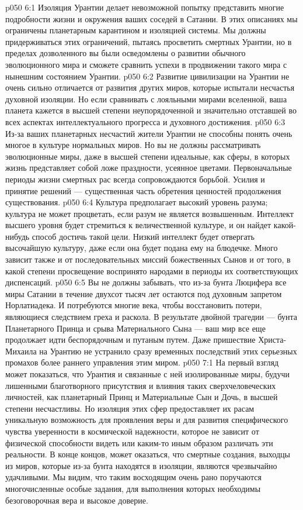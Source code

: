 \vs p050 6:1 Изоляция Урантии делает невозможной попытку представить многие подробности жизни и окружения ваших соседей в Сатании. В этих описаниях мы ограничены планетарным карантином и изоляцией системы. Мы должны придерживаться этих ограничений, пытаясь просветить смертных Урантии, но в пределах дозволенного вы были осведомлены о развитии обычного эволюционного мира и сможете сравнить успехи в продвижении такого мира с нынешним состоянием Урантии.
\vs p050 6:2 Развитие цивилизации на Урантии не очень сильно отличается от развития других миров, которые испытали несчастья духовной изоляции. Но если сравнивать с лояльными мирами вселенной, ваша планета кажется в высшей степени неупорядоченной и значительно отставшей во всех аспектах интеллектуального прогресса и духовного достижения.
\vs p050 6:3 Из\hyp{}за ваших планетарных несчастий жители Урантии не способны понять очень многое в культуре нормальных миров. Но вы не должны рассматривать эволюционные миры, даже в высшей степени идеальные, как сферы, в которых жизнь представляет собой ложе праздности, усеянное цветами. Первоначальные периоды жизни смертных рас всегда сопровождаются борьбой. Усилия и принятие решений --- существенная часть обретения ценностей продолжения существования.
\vs p050 6:4 Культура предполагает высокий уровень разума; культура не может процветать, если разум не является возвышенным. Интеллект высшего уровня будет стремиться к величественной культуре, и он найдет какой\hyp{}нибудь способ достичь такой цели. Низкий интеллект будет отвергать высочайшую культуру, даже если она будет подана ему на блюдечке. Много зависит также и от последовательных миссий божественных Сынов и от того, в какой степени просвещение воспринято народами в периоды их соответствующих диспенсаций.
\vs p050 6:5 \pc Вы не должны забывать, что из\hyp{}за бунта Люцифера все миры Сатании в течение двухсот тысяч лет остаются под духовным запретом Норлатиадека. И потребуются многие века, чтобы восстановить потери, являющиеся следствием греха и раскола. В результате двойной трагедии --- бунта Планетарного Принца и срыва Материального Сына --- ваш мир все еще продолжает идти беспорядочным и путаным путем. Даже пришествие Христа\hyp{}Михаила на Урантию не устранило сразу временных последствий этих серьезных промахов более раннего управления этим миром.
\vs p050 7:1 На первый взгляд может показаться, что Урантия и связанные с ней изолированные миры, будучи лишенными благотворного присутствия и влияния таких сверхчеловеческих личностей, как планетарный Принц и Материальные Сын и Дочь, в высшей степени несчастливы. Но изоляция этих сфер предоставляет их расам уникальную возможность для проявления веры и для развития специфического чувства уверенности в космической надежности, которое не зависит от физической способности видеть или каким\hyp{}то иным образом различать эти реальности. В конце концов, может оказаться, что смертные создания, выходцы из миров, которые из\hyp{}за бунта находятся в изоляции, являются чрезвычайно удачливыми. Мы видим, что таким восходящим очень рано поручаются многочисленные особые задания, для выполнения которых необходимы безоговорочная вера и высокое доверие.
